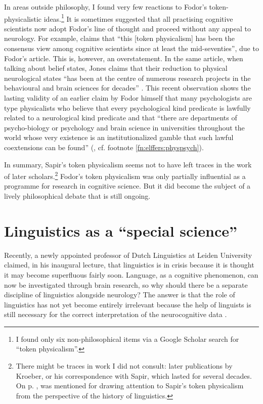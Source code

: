 \documentclass[output=paper]{langscibook}
\begin{document}
In areas outside philosophy, I found very few reactions to Fodor's token-physical\-istic ideas.\footnote{I found only six non-philosophical items via a Google Scholar search for ``token physicalism''.}  It is sometimes suggested that all practising cognitive scientists now adopt Fodor's line of thought and proceed without any appeal to neurology. For example, \citet{Jones2004}  claims that ``this [token physicalism] has been the consensus view among cognitive scientists since at least the mid-seventies'', due to Fodor's \citeyear{Fodor1974} article. This is, however, an overstatement. In the same article, when talking about belief states, Jones claims that their reduction to physical neurological states ``has been at the centre of numerous research projects in the behavioural and brain sciences for decades'' \citep[423]{Jones2004}. This recent observation shows the lasting validity of an earlier claim by Fodor himself that many psychologists are type physicalists who believe that every psychological kind predicate is lawfully related to a neurological kind predicate and that ``there are departments of psycho-biology or psychology and brain science in universities throughout the world whose very existence is an institutionalized gamble that such lawful coextensions can be found'' (\citealt[105]{Fodor1974}, cf. footnote \ref{fn:elffers:physpsych}).

In summary, Sapir's token physicalism seems not to have left traces in the work of later scholars.\footnote{There might be traces in work I did not consult: later publications by Kroeber, or his correspondence with Sapir, which lasted for several decades. On p. \pageref{q:elffers:silversteinref}, \citet{Silverstein1986} was mentioned for drawing attention to Sapir's token physicalism from the perspective of the history of linguistics.} Fodor's token physicalism was only partially influential as a programme for research in cognitive science. But it did become the subject of a lively philosophical debate that is still ongoing.

\section{Linguistics as a ``special science''}
\label{sec:elffers:linguisticsasspecialscience}

Recently, a newly appointed professor of Dutch Linguistics at Leiden University claimed, in his inaugural lecture, that linguistics is in crisis because it is thought it may become superfluous fairly soon. Language, as a cognitive phenomenon, can now be investigated through brain research, so why should there be a separate discipline of linguistics alongside neurology? The answer is that the role of linguistics has not yet become entirely irrelevant because the help of linguists is still necessary for the correct interpretation of the neurocognitive data \citep{Barbiers2017}.
\end{document}
